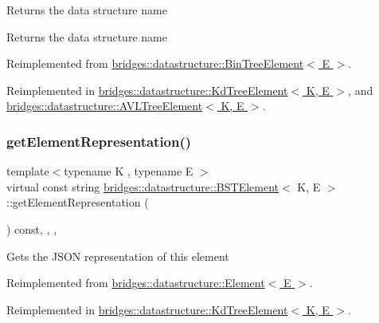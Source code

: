 Returns the data structure name \begin{DoxyReturn}{Returns}
the data structure name 
\end{DoxyReturn}


Reimplemented from \hyperlink{classbridges_1_1datastructure_1_1_bin_tree_element_aef86e3663785972251547e409fdc757b}{bridges\+::datastructure\+::\+Bin\+Tree\+Element$<$ E $>$}.



Reimplemented in \hyperlink{classbridges_1_1datastructure_1_1_kd_tree_element_a76f6d9bfadfdec09d0a8564aa0e33235}{bridges\+::datastructure\+::\+Kd\+Tree\+Element$<$ K, E $>$}, and \hyperlink{classbridges_1_1datastructure_1_1_a_v_l_tree_element_ab04d1e9ad4630e408041e8137dc9854a}{bridges\+::datastructure\+::\+A\+V\+L\+Tree\+Element$<$ K, E $>$}.

\mbox{\label{classbridges_1_1datastructure_1_1_b_s_t_element_a8f962a01b6e0eff59abeee7768264fd9}} 
\subsubsection{\texorpdfstring{get\+Element\+Representation()}{getElementRepresentation()}}
{\footnotesize\ttfamily template$<$typename K , typename E $>$ \\
virtual const string \hyperlink{classbridges_1_1datastructure_1_1_b_s_t_element}{bridges\+::datastructure\+::\+B\+S\+T\+Element}$<$ K, E $>$\+::get\+Element\+Representation (\begin{DoxyParamCaption}{ }\end{DoxyParamCaption}) const\hspace{0.3cm}{\ttfamily [inline]}, {\ttfamily [override]}, {\ttfamily [protected]}, {\ttfamily [virtual]}}

Gets the J\+S\+ON representation of this element 

Reimplemented from \hyperlink{classbridges_1_1datastructure_1_1_element_a285fc51d6dfcb8bff2d72f7e4addfe6d}{bridges\+::datastructure\+::\+Element$<$ E $>$}.



Reimplemented in \hyperlink{classbridges_1_1datastructure_1_1_kd_tree_element_a5413ecaf152e3df5fb45dd85da812888}{bridges\+::datastructure\+::\+Kd\+Tree\+Element$<$ K, E $>$}.

